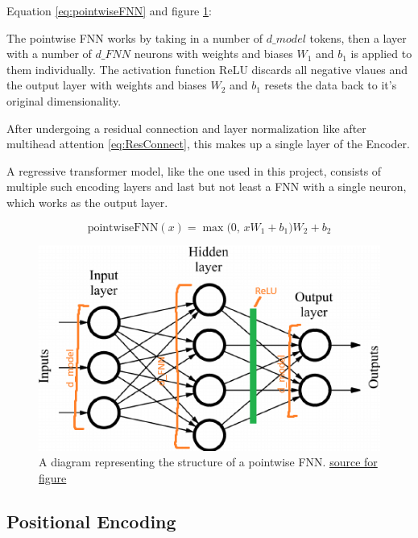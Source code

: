 \documentclass{article}
\begin{document}
Equation \eqref{eq:pointwiseFNN} and figure \ref{fig:pointwiseFNN}:

The pointwise FNN works by taking in a number of $d\_model$ tokens, then a 
layer with a number of $d\_FNN$ neurons with weights and biases $W_1$ and $b_1$ 
is applied to them individually. The activation function ReLU discards all 
negative vlaues and the output layer with weights and biases $W_2$ and $b_1$ 
resets the data back to it's original dimensionality.

After undergoing a residual connection and layer normalization like after 
multihead attention \eqref{eq:ResConnect}, this makes up a single layer of the 
Encoder.

A regressive transformer model, like the one used in this project, consists of 
multiple such encoding layers and last but not least a FNN with a single neuron, 
which works as the output layer.

\begin{equation}
    \text{pointwiseFNN}(x) = \max\bigl(0, \, x W_1 + b_1 \bigr) W_2 + b_2 \label{eq:pointwiseFNN}
\end{equation}

\begin{figure}[htbp]
    \centering
    \includegraphics[width=0.4\paperwidth]{images/pointwiseFNN.png}
    \caption{A diagram representing the structure of a pointwise FNN. \href{https://datascience.stackexchange.com/questions/68020/what-is-the-feedforward-network-in-a-transformer-trained-on}
    {source for figure}}
    \label{fig:pointwiseFNN}
\end{figure}

\subsection{Positional Encoding}
\end{document}
